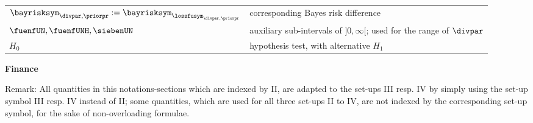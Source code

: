 \begin{longtable}{ll}
\\
\hspace{-0.33cm} ${\bayrisksym}_{\divpar,{\priorpr}} := {\bayrisksym}_{{\lossfusym}_{\divpar,{\priorpr}}}$ &
corresponding Bayes risk difference
\\
\hspace{-0.33cm} $\fuenfUN,\fuenfUNH,\siebenUN$ & auxiliary sub-intervals of $]0,\infty[$; 
used for the range of $\divpar$
\\
\hspace{-0.33cm} $H_0$ & hypothesis test, with alternative $H_1$
\\


\end{longtable}

{\large \bf Finance}


Remark: All quantities in this notations-sections which are indexed by II, are adapted to the set-ups
III resp. IV by simply using the set-up symbol III resp. IV instead
of II;
some quantities, which are used for all three set-ups II to IV, are not indexed by the corresponding set-up symbol, for the sake of non-overloading formulae.

\par


